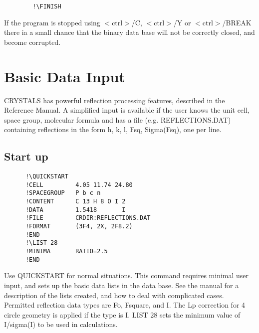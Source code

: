 \documentclass[10pt,a4paper]{report}
\begin{document}
\small\begin{verbatim}
        !\FINISH
\end{verbatim}\normalsize




If the program is stopped using $<$ctrl$>$/C, $<$ctrl$>$/Y or $<$ctrl$>$/BREAK
there ia a small chance that the binary data base will not be correctly
closed, and become corrupted.



\chapter{Basic Data Input}


CRYSTALS has powerful reflection processing features, described in the Reference Manual. A simplified input is available if the user knows the unit cell, space group, molecular formula and has a file (e.g. REFLECTIONS.DAT) containing reflections in the form h, k, l, Fsq, Sigma(Fsq), one per line.

\section{Start up}

\small\begin{verbatim}
      !\QUICKSTART
      !CELL         4.05 11.74 24.80
      !SPACEGROUP   P b c n
      !CONTENT      C 13 H 8 O I 2
      !DATA         1.5418       I
      !FILE         CRDIR:REFLECTIONS.DAT
      !FORMAT       (3F4, 2X, 2F8.2)
      !END
      !\LIST 28
      !MINIMA       RATIO=2.5
      !END
\end{verbatim}\normalsize




\bigskip{}


\bigskip{}


Use QUICKSTART for normal situations.
 This command requires minimal user input, and sets up the basic data
 lists in the data base. See the manual
 for a description of the lists created, and how
 to deal with complicated cases. Permitted reflection data types are Fo,
 Fsquare, and I. The Lp correction for 4 circle geometry is applied if the
 type is I. LIST 28 sets the minimum value of
 I/sigma(I) to be used in calculations.



\bigskip{}


\bigskip{}
\end{document}
